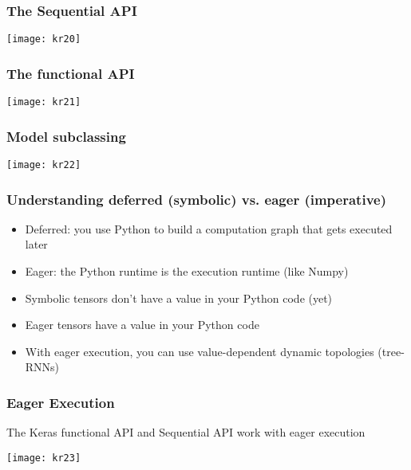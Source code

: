 \begin{frame}[fragile] \frametitle{The Sequential API}
\begin{center}
\texttt{[image: kr20]}
\end{center}
\end{frame}

\begin{frame}[fragile] \frametitle{The functional API}
\begin{center}
\texttt{[image: kr21]}
\end{center}
\end{frame}

\begin{frame}[fragile] \frametitle{Model subclassing}
\begin{center}
\texttt{[image: kr22]}
\end{center}
\end{frame}

\begin{frame}[fragile] \frametitle{Understanding deferred (symbolic)
vs. eager (imperative)}

\begin{itemize}
\item  Deferred: you use Python to build a computation graph that gets executed later
\item  Eager: the Python runtime is the execution runtime (like Numpy)
\item Symbolic tensors don’t have a value in your Python code (yet)
\item  Eager tensors have a value in your Python code
\item With eager execution, you can use value-dependent dynamic topologies 
(tree-RNNs)
\end{itemize}
\end{frame}

\begin{frame}[fragile] \frametitle{Eager Execution}

The Keras functional API and Sequential API work with eager execution


\begin{center}
\texttt{[image: kr23]}
\end{center}
\end{frame}


